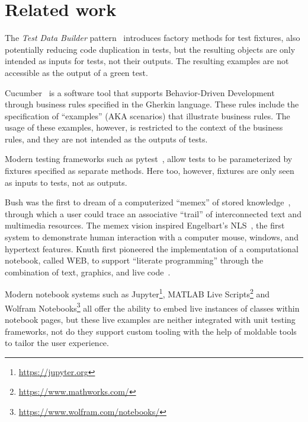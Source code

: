 \documentclass[sigplan,anonymous,review,10pt]{acmart}
\begin{document}


\section{Related work}\label{sec:related}


The \emph{Test Data Builder} pattern~\cite{Free09a} introduces factory methods for test fixtures, also potentially reducing code duplication in tests, but the resulting objects are only intended as inputs for tests, not their outputs.
The resulting examples are not accessible as the output of a green test.

Cucumber~\cite{Hell17a} is a software tool that supports Behavior-Driven Development through business rules specified in the Gherkin language.
These rules include the specification of ``examples'' (AKA scenarios) that illustrate business rules.
The usage of these examples, however, is restricted to the context of the business rules, and they are not intended as the outputs of tests.

Modern testing frameworks such as pytest~\cite{Okke22a}, allow tests to be parameterized by fixtures specified as separate methods.
Here too, however, fixtures are only seen as inputs to tests, not as outputs.


Bush was the first to dream of a computerized ``memex'' of stored knowledge~\cite{Bush45a}, through which a user could trace an associative ``trail'' of interconnected text and multimedia resources.
The memex vision inspired Engelbart's NLS~\cite{Enge68a}, the first system to demonstrate human interaction with a computer mouse, windows, and hypertext features.
Knuth first pioneered the implementation of a computational notebook, called WEB, to support ``literate programming'' through the combination of text, graphics, and live code~\cite{Knut97a}.

Modern notebook systems such as Jupyter\footnote{\url{https://jupyter.org}}, MATLAB Live Scripts\footnote{\url{https://www.mathworks.com/}} and Wolfram Notebooks\footnote{\url{https://www.wolfram.com/notebooks/}} all offer the ability to embed live instances of classes within notebook pages, but these live examples are neither integrated with unit testing frameworks, not do they support custom tooling with the help of moldable tools to tailor the user experience.
\end{document}
